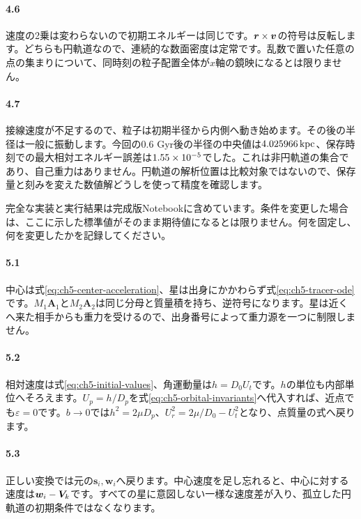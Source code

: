 \paragraph{4.6}
速度の2乗は変わらないので初期エネルギーは同じです。$\boldsymbol r\times\boldsymbol v$の符号は反転します。どちらも円軌道なので、連続的な数面密度は定常です。乱数で置いた任意の点の集まりについて、同時刻の粒子配置全体が$x$軸の鏡映になるとは限りません。

\paragraph{4.7}
接線速度が不足するので、粒子は初期半径から内側へ動き始めます。その後の半径は一般に振動します。今回の0.6 Gyr後の半径の中央値は$4.025966\,\mathrm{kpc}$、保存時刻での最大相対エネルギー誤差は$1.55\times 10^{-5}$でした。これは非円軌道の集合であり、自己重力はありません。円軌道の解析位置は比較対象ではないので、保存量と刻みを変えた数値解どうしを使って精度を確認します。

完全な実装と実行結果は完成版Notebookに含めています。条件を変更した場合は、ここに示した標準値がそのまま期待値になるとは限りません。何を固定し、何を変更したかを記録してください。



\paragraph{5.1}
中心は式\eqref{eq:ch5-center-acceleration}、星は出身にかかわらず式\eqref{eq:ch5-tracer-ode}です。$M_1\boldsymbol A_1$と$M_2\boldsymbol A_2$は同じ分母と質量積を持ち、逆符号になります。星は近くへ来た相手からも重力を受けるので、出身番号によって重力源を一つに制限しません。

\paragraph{5.2}
相対速度は式\eqref{eq:ch5-initial-values}、角運動量は$h=D_0U_t$です。$h$の単位も内部単位へそろえます。$U_p=h/D_p$を式\eqref{eq:ch5-orbital-invariants}へ代入すれば、近点でも$\varepsilon=0$です。$b\to0$では$h^2=2\mu D_p$、$U_r^2=2\mu/D_0-U_t^2$となり、点質量の式へ戻ります。

\paragraph{5.3}
正しい変換では元の$\boldsymbol s_i,\boldsymbol w_i$へ戻ります。中心速度を足し忘れると、中心に対する速度は$\boldsymbol w_i-\boldsymbol V_k$です。すべての星に意図しない一様な速度差が入り、孤立した円軌道の初期条件ではなくなります。

